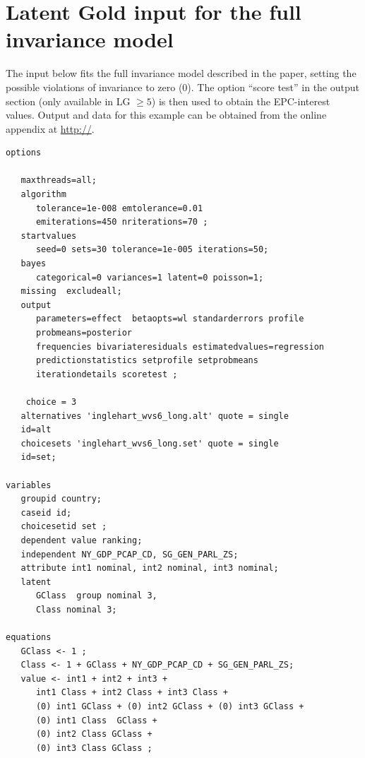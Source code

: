 \documentclass[letterpaper,12pt]{article}
\begin{document}
\clearpage




\clearpage\appendix
\section{Latent Gold input for the full invariance model}\label{sec:LGinput}

The input below fits the full invariance model described in the paper, setting the possible violations of invariance to zero (0). The option ``score test'' in the output section (only available in LG $\geq5$) is then used to obtain the EPC-interest values.
Output and data for this example can be obtained from the online appendix at \url{http://}.

\begin{small}
\singlespace
\begin{verbatim}
options

   maxthreads=all;
   algorithm 
      tolerance=1e-008 emtolerance=0.01 
      emiterations=450 nriterations=70 ;
   startvalues
      seed=0 sets=30 tolerance=1e-005 iterations=50;
   bayes
      categorical=0 variances=1 latent=0 poisson=1;
   missing  excludeall;
   output      
      parameters=effect  betaopts=wl standarderrors profile 
      probmeans=posterior
      frequencies bivariateresiduals estimatedvalues=regression
      predictionstatistics setprofile setprobmeans 
      iterationdetails scoretest ;

	choice = 3
   alternatives 'inglehart_wvs6_long.alt' quote = single
   id=alt
   choicesets 'inglehart_wvs6_long.set' quote = single
   id=set;

variables
   groupid country;
   caseid id;
   choicesetid set ;
   dependent value ranking;
   independent NY_GDP_PCAP_CD, SG_GEN_PARL_ZS;
   attribute int1 nominal, int2 nominal, int3 nominal;
   latent
      GClass  group nominal 3, 
      Class nominal 3;

equations
   GClass <- 1 ;
   Class <- 1 + GClass + NY_GDP_PCAP_CD + SG_GEN_PARL_ZS;
   value <- int1 + int2 + int3 + 
      int1 Class + int2 Class + int3 Class + 
      (0) int1 GClass + (0) int2 GClass + (0) int3 GClass + 
      (0) int1 Class  GClass + 
      (0) int2 Class GClass + 
      (0) int3 Class GClass ;
\end{verbatim}

\end{small}
\end{document}

